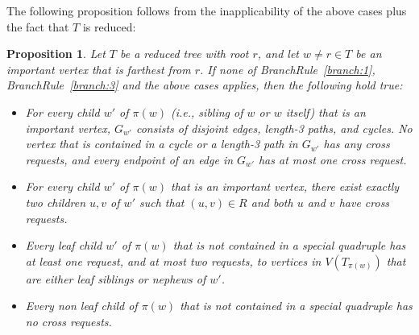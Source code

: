 \documentclass[11pt]{article}
\newtheorem{proposition}[theorem]{Proposition}
\begin{document}
The following proposition follows from the inapplicability of the above cases plus the fact that $T$ is reduced:


\begin{proposition}
\label{prop:properties}
Let $T$ be a reduced tree with root $r$, and let $w \neq r \in T$ be an important vertex that is farthest from $r$. If none of BranchRule~\ref{branch:1}, BranchRule~\ref{branch:3} and the above cases applies, then the following hold true:

\begin{itemize}

\item[(i)] For every child $w'$ of $\pi(w)$ (i.e., sibling of $w$ or $w$ itself) that is an important vertex, $G_{w'}$ consists of disjoint edges, length-3 paths, and cycles. No vertex that is contained in a cycle or a length-3 path in $G_{w'}$ has any cross requests, and every endpoint of an edge in $G_{w'}$ has at most one cross request.

\item[(ii)] For every child $w'$ of $\pi(w)$ that is an important vertex, there exist exactly two children $u, v$ of $w'$ such that $(u, v) \in R$ and both $u$ and $v$ have cross requests.

\item[(iii)] Every leaf child $w'$  of $\pi(w)$ that is not contained in a special quadruple has at least one request, and at most two requests, to vertices in $V(T_{\pi(w)})$ that are either leaf siblings or nephews of $w'$.


\item[(iv)] Every non leaf child of $\pi(w)$ that is not contained in a special quadruple has no cross requests.
\end{itemize}
\end{proposition}
\end{document}
